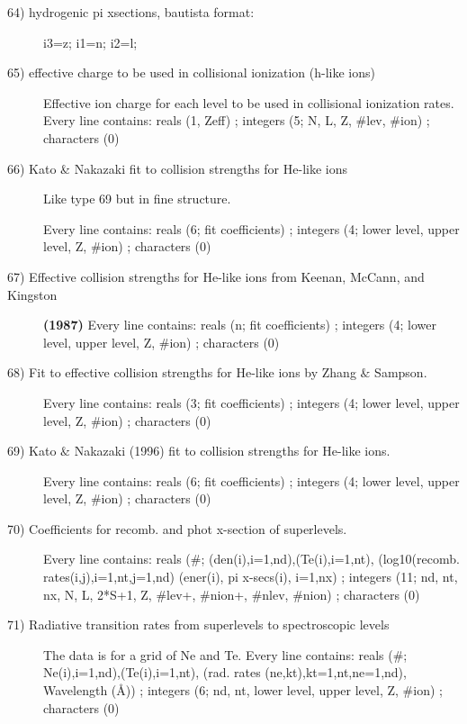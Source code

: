 \begin{description}
\item[64) hydrogenic pi xsections, bautista format:]

i3=z; i1=n; i2=l;

\item[65) effective charge to be used in collisional ionization (h-like
ions)]
 Effective ion charge for each level to be used in collisional ionization
 rates.
 Every line contains:
 reals (1, Zeff)
; integers (5; N, L, Z, $\#$lev, $\#$ion)
; characters (0)

\item[66) Kato \& Nakazaki fit to collision strengths for He-like ions] 

Like type 69 but in fine structure.

 Every line contains:
 reals (6; fit coefficients)
; integers (4; lower level, upper level, Z, $\#$ion)
; characters (0)


\item[67) Effective collision strengths for He-like ions from Keenan, McCann, and Kingston]
{\bf (1987)} 
 Every line contains:
 reals (n; fit coefficients)
; integers (4; lower level, upper level, Z, $\#$ion)
; characters (0)

\item[68) Fit to effective collision strengths for He-like ions by Zhang $\&$ Sampson. ]
 Every line contains:
 reals (3; fit coefficients)
; integers (4; lower level, upper level, Z, $\#$ion)
; characters (0)

\item[69) Kato $\&$ Nakazaki (1996) fit to collision strengths for He-like ions.]
 Every line contains:
 reals (6; fit coefficients)
; integers (4; lower level, upper level, Z, $\#$ion)
; characters (0)

\item[70) Coefficients for recomb. and phot x-section of superlevels.]
 Every line  contains:
 reals ($\#$; (den(i),i=1,nd),(Te(i),i=1,nt),
        (log10(recomb. rates(i,j),i=1,nt,j=1,nd)
        (ener(i), pi x-secs(i), i=1,nx)
; integers (11; nd, nt, nx, N, L, 2*S+1, Z, $\#$lev+, $\#$nion+, $\#$nlev, $\#$nion)
; characters (0)

\item[71) Radiative transition rates from superlevels to spectroscopic levels]
 The data is for a grid of Ne and  
 Te. 
 Every line  contains:
 reals ($\#$; Ne(i),i=1,nd),(Te(i),i=1,nt),
        (rad. rates (ne,kt),kt=1,nt,ne=1,nd), Wavelength (\AA)) 
; integers (6; nd, nt, lower level, upper level, Z, $\#$ion)
; characters (0)


\end{description}
